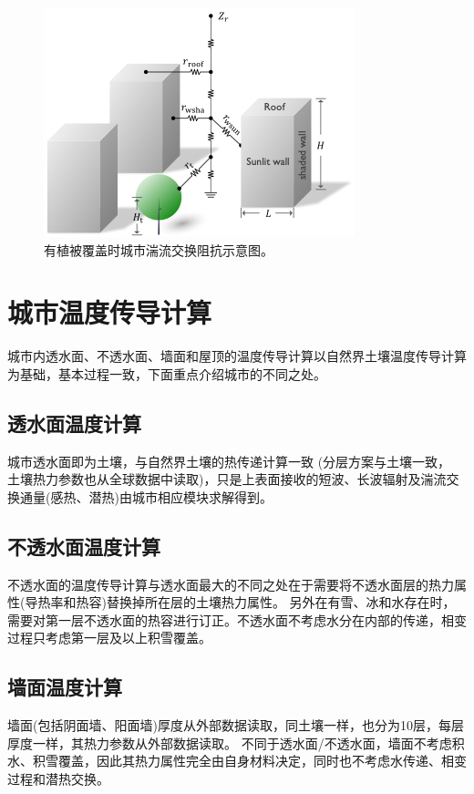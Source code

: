 {
\begin{figure}[htbp]
\centering
\includegraphics{Figures/城市模式/有植被覆盖时城市湍流交换阻抗示意图.png}
\caption{有植被覆盖时城市湍流交换阻抗示意图。}
\label{fig:有植被覆盖时城市湍流交换阻抗示意图}
\end{figure}
}


\section{城市温度传导计算}
城市内透水面、不透水面、墙面和屋顶的温度传导计算以自然界土壤温度传导计算为基础，基本过程一致，下面重点介绍城市的不同之处。

\subsection{透水面温度计算}
城市透水面即为土壤，与自然界土壤的热传递计算一致 (分层方案与土壤一致，
土壤热力参数也从全球数据中读取)，只是上表面接收的短波、长波辐射及湍流交换通量(感热、潜热)由城市相应模块求解得到。

\subsection{不透水面温度计算}
不透水面的温度传导计算与透水面最大的不同之处在于需要将不透水面层的热力属性(导热率和热容)替换掉所在层的土壤热力属性。
另外在有雪、冰和水存在时，需要对第一层不透水面的热容进行订正。不透水面不考虑水分在内部的传递，相变过程只考虑第一层及以上积雪覆盖。

\subsection{墙面温度计算}
墙面(包括阴面墙、阳面墙)厚度从外部数据读取，同土壤一样，也分为10层，每层厚度一样，其热力参数从外部数据读取。
不同于透水面/不透水面，墙面不考虑积水、积雪覆盖，因此其热力属性完全由自身材料决定，同时也不考虑水传递、相变过程和潜热交换。

